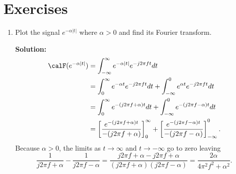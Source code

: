 \documentclass[11pt,a4paper]{book}
\theoremstyle{plain}
\numberwithin{equation}{section}
\newcommand{\abs}[1]{\left\vert #1 \right\vert}
\newenvironment{solution}{\begin{footnotesize}\textbf{Solution:}}{\end{footnotesize}}
\newenvironment{excersizelist}{%
  \renewcommand*{\theenumi}{\thechapter.\arabic{enumi}}%
  \newcommand\itemadvanced{\stepcounter{enumi}\item[$\ast$\, \theenumi.]}
  \begin{enumerate}
}{%
  \end{enumerate}
}
\begin{document}


\section{Exercises}


\begin{excersizelist}

\item \label{exer:fourtransealphaabs} Plot the signal $e^{-\alpha\abs{t}}$ where $\alpha > 0$ and find its Fourier transform.
\begin{solution}
\begin{align*}
\calF(e^{-\alpha\abs{t}}) &= \int_{-\infty}^{\infty} e^{-\alpha\abs{t}} e^{-j2\pi f t} dt \\
&= \int_{0}^{\infty} e^{-\alpha t} e^{-j2\pi f t} dt  + \int_{-\infty}^{0} e^{\alpha t} e^{-j2\pi f t} dt \\
&= \int_{0}^{\infty} e^{-(j2\pi f + \alpha)t} dt  + \int_{-\infty}^{0} e^{-(j2\pi f - \alpha) t} dt \\
&= \left[ \frac{e^{-(j2\pi f + \alpha)t}}{-(j2\pi f + \alpha)} \right]_{0}^{\infty}  + \left[ \frac{e^{-(j2\pi f - \alpha)t}}{-(j2\pi f - \alpha)} \right]_{-\infty}^{0}.
\end{align*}
Because $\alpha > 0$, the limits as $t\to\infty$ and $t\to-\infty$ go to zero leaving
\[
\frac{1}{j2\pi f + \alpha} - \frac{1}{j2\pi f - \alpha} = \frac{j2\pi f + \alpha - j2\pi f + \alpha}{(j2\pi f + \alpha)(j2\pi f - \alpha)} = \frac{2\alpha}{4\pi^2 f^2 + \alpha^2}.
\]
\end{solution}


\end{excersizelist}
\end{document}
